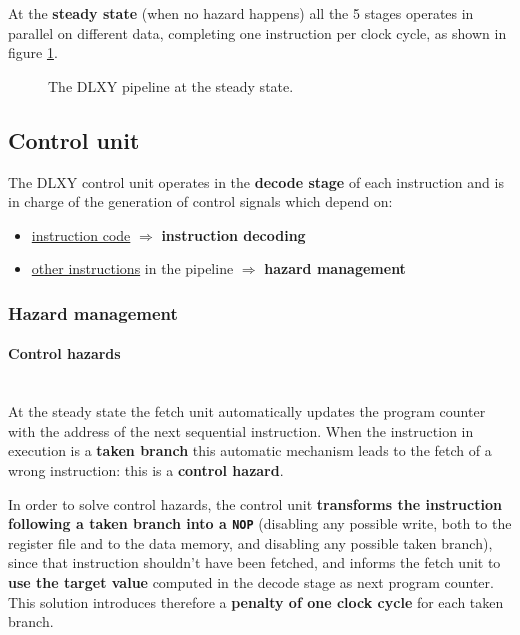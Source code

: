 At the \textbf{steady state} (when no hazard happens) all the 5 stages operates
in parallel on different data, completing one instruction per clock cycle, as
shown in figure \ref{fig:pipeline_steady}.
\begin{figure}[H]
	\centering
	\caption{The DLXY pipeline at the steady state.}
	\label{fig:pipeline_steady}
\end{figure}

\subsection{Control unit}
The DLXY control unit operates in the \textbf{decode stage} of each instruction
and is in charge of the generation of control signals which depend on:
\begin{itemize}
	\item \underline{instruction code} $\Rightarrow$ \textbf{instruction decoding}
	\item \underline{other instructions} in the pipeline $\Rightarrow$
		\textbf{hazard management}
\end{itemize}

\subsubsection{Hazard management}

\paragraph{Control hazards} \mbox{} \\
At the steady state the fetch unit automatically updates the program counter
with the address of the next sequential instruction.
When the instruction in execution is a \textbf{taken branch} this automatic
mechanism leads to the fetch of a wrong instruction: this is a
\textbf{control hazard}.

\bigskip
In order to solve control hazards, the control unit \textbf{transforms
the instruction following a taken branch into a \texttt{NOP}} (disabling any
possible write, both to the register file and to the data memory, and disabling
any possible taken branch), since that instruction shouldn't have been fetched,
and informs the fetch unit to \textbf{use the target value} computed in the
decode stage as next program counter. This solution introduces therefore a
\textbf{penalty of one clock cycle} for each taken branch.

